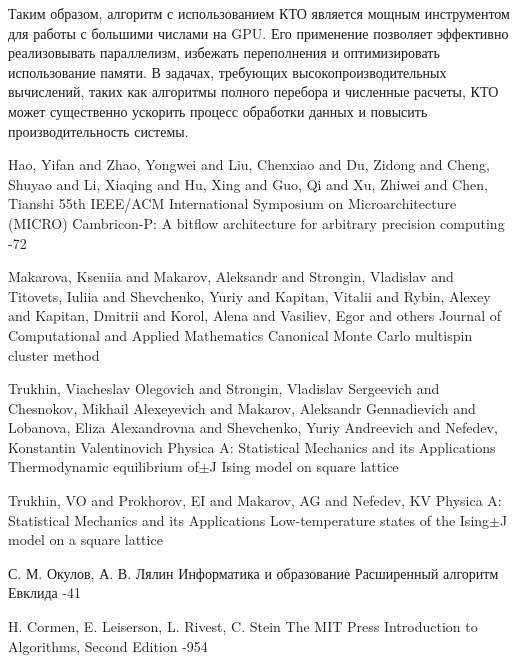 \documentclass[10pt]{article}
\begin{document}
Таким образом, алгоритм с использованием КТО является мощным инструментом для работы с большими числами на GPU. Его применение позволяет эффективно реализовывать параллелизм, избежать переполнения и оптимизировать использование памяти. В задачах, требующих высокопроизводительных вычислений, таких как алгоритмы полного перебора и численные расчеты, КТО может существенно ускорить процесс обработки данных и повысить производительность системы.

\begin{thebibliography}{20}
\setlength{\parsep}{0pt}\setlength{\itemsep}{3pt}

\by Hao, Yifan and Zhao, Yongwei and Liu, Chenxiao and Du, Zidong and Cheng, Shuyao and Li, Xiaqing and Hu, Xing and Guo, Qi and Xu, Zhiwei and Chen, Tianshi
 55th IEEE/ACM International Symposium on Microarchitecture (MICRO)
\paper Cambricon-P: A bitflow architecture for arbitrary precision computing
-72

\by Makarova, Kseniia and Makarov, Aleksandr and Strongin, Vladislav and Titovets, Iuliia and Shevchenko, Yuriy and Kapitan, Vitalii and Rybin, Alexey and Kapitan, Dmitrii and Korol, Alena and Vasiliev, Egor and others
\jour Journal of Computational and Applied Mathematics
\paper Canonical Monte Carlo multispin cluster method

\by Trukhin, Viacheslav Olegovich and Strongin, Vladislav Sergeevich and Chesnokov, Mikhail Alexeyevich and Makarov, Aleksandr Gennadievich and Lobanova, Eliza Alexandrovna and Shevchenko, Yuriy Andreevich and Nefedev, Konstantin Valentinovich
\jour Physica A: Statistical Mechanics and its Applications
\paper Thermodynamic equilibrium of$\pm$J Ising model on square lattice

\by Trukhin, VO and Prokhorov, EI and Makarov, AG and Nefedev, KV
\jour Physica A: Statistical Mechanics and its Applications
\paper Low-temperature states of the Ising$\pm$J model on a square lattice

\by С. М. Окулов, А. В. Лялин
\jour Информатика и образование
\paper Расширенный алгоритм Евклида
-41

\by H. Cormen, E. Leiserson, L. Rivest, C. Stein
\jour The MIT Press 
\paper Introduction to Algorithms, Second Edition
-954



\end{thebibliography}
\end{document}

